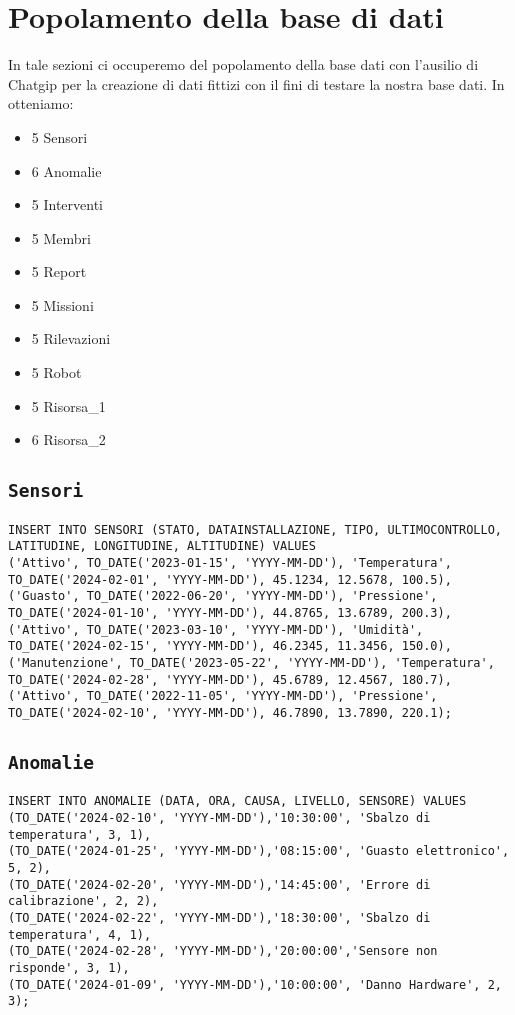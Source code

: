 \section{Popolamento della base di dati}
In tale sezioni ci occuperemo del popolamento della base dati con l'ausilio di Chatgip per la creazione di dati fittizi con il fini di testare la nostra base dati. In otteniamo:
\begin{itemize}
\item 5 Sensori
\item 6 Anomalie
\item 5 Interventi
\item 5 Membri
\item 5 Report
\item 5 Missioni
\item 5 Rilevazioni
\item 5 Robot
\item 5 Risorsa\_1
\item 6 Risorsa\_2
\end{itemize}
\subsection{\texttt{Sensori}}
\begin{verbatim}
INSERT INTO SENSORI (STATO, DATAINSTALLAZIONE, TIPO, ULTIMOCONTROLLO, LATITUDINE, LONGITUDINE, ALTITUDINE) VALUES
('Attivo', TO_DATE('2023-01-15', 'YYYY-MM-DD'), 'Temperatura', TO_DATE('2024-02-01', 'YYYY-MM-DD'), 45.1234, 12.5678, 100.5),
('Guasto', TO_DATE('2022-06-20', 'YYYY-MM-DD'), 'Pressione', TO_DATE('2024-01-10', 'YYYY-MM-DD'), 44.8765, 13.6789, 200.3),
('Attivo', TO_DATE('2023-03-10', 'YYYY-MM-DD'), 'Umidità', TO_DATE('2024-02-15', 'YYYY-MM-DD'), 46.2345, 11.3456, 150.0),
('Manutenzione', TO_DATE('2023-05-22', 'YYYY-MM-DD'), 'Temperatura', TO_DATE('2024-02-28', 'YYYY-MM-DD'), 45.6789, 12.4567, 180.7),
('Attivo', TO_DATE('2022-11-05', 'YYYY-MM-DD'), 'Pressione', TO_DATE('2024-02-10', 'YYYY-MM-DD'), 46.7890, 13.7890, 220.1);
\end{verbatim}
\subsection{\texttt{Anomalie}}
\begin{verbatim}
INSERT INTO ANOMALIE (DATA, ORA, CAUSA, LIVELLO, SENSORE) VALUES 
(TO_DATE('2024-02-10', 'YYYY-MM-DD'),'10:30:00', 'Sbalzo di temperatura', 3, 1),
(TO_DATE('2024-01-25', 'YYYY-MM-DD'),'08:15:00', 'Guasto elettronico', 5, 2),
(TO_DATE('2024-02-20', 'YYYY-MM-DD'),'14:45:00', 'Errore di calibrazione', 2, 2),
(TO_DATE('2024-02-22', 'YYYY-MM-DD'),'18:30:00', 'Sbalzo di temperatura', 4, 1),
(TO_DATE('2024-02-28', 'YYYY-MM-DD'),'20:00:00','Sensore non risponde', 3, 1),
(TO_DATE('2024-01-09', 'YYYY-MM-DD'),'10:00:00', 'Danno Hardware', 2, 3);
\end{verbatim}
